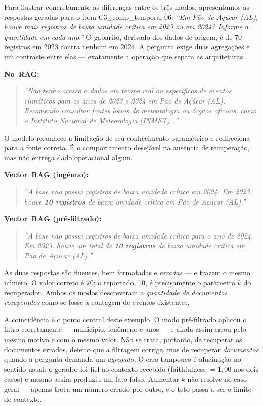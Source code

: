 \documentclass[conference]{IEEEtran}
\begin{document}
Para ilustrar concretamente as diferenças entre os três modos,
apresentamos as respostas geradas para o item C3\_comp\_temporal-06:
\emph{``Em Pão de Açúcar (AL), houve mais registros de baixa umidade
crítica em 2023 ou em 2024? Informe a quantidade em cada ano.''}
O gabarito, derivado dos dados de origem, é de 70 registros em 2023
contra nenhum em 2024. A pergunta exige duas agregações e um contraste
entre elas --- exatamente a operação que separa as arquiteturas.

\textbf{No~RAG:}
\begin{quote}
\textit{``Não tenho acesso a dados em tempo real ou específicos de
eventos climáticos para os anos de 2023 e 2024 em Pão de Açúcar (AL).
Recomendo consultar fontes locais de meteorologia ou órgãos oficiais,
como o Instituto Nacional de Meteorologia (INMET)\ldots''}
\end{quote}
O modelo reconhece a limitação de seu conhecimento paramétrico e
redireciona para a fonte correta. É o comportamento desejável na
ausência de recuperação, mas não entrega dado operacional algum.

\textbf{Vector~RAG (ingênuo):}
\begin{quote}
\textit{``A base não possui registros de baixa umidade crítica em 2024.
Em 2023, houve \textbf{10 registros} de baixa umidade crítica em Pão de
Açúcar (AL).''}
\end{quote}

\textbf{Vector~RAG (pré-filtrado):}
\begin{quote}
\textit{``A base não possui registros de baixa umidade crítica para o ano de
2024. Em 2023, houve um total de \textbf{10 registros} de baixa umidade crítica
em Pão de Açúcar (AL).''}
\end{quote}
As duas respostas são fluentes, bem formatadas e \emph{erradas} --- e trazem o
mesmo número. O valor correto é 70; o reportado, 10, é precisamente o parâmetro
$k$ do recuperador. Ambos os modos descreveram a \emph{quantidade de documentos
recuperados} como se fosse a contagem de eventos existentes.

A coincidência é o ponto central deste exemplo. O modo pré-filtrado aplicou o
filtro corretamente --- município, fenômeno e anos --- e ainda assim errou pelo
mesmo motivo e com o mesmo valor. Não se trata, portanto, de recuperar os
documentos errados, defeito que a filtragem corrige, mas de recuperar
\emph{documentos} quando a pergunta demanda um \emph{agregado}. O erro tampouco
é alucinação no sentido usual: o gerador foi fiel ao contexto recebido
(faithfulness $=1{,}00$ nos dois casos) e mesmo assim produziu um fato falso.
Aumentar $k$ não resolve no caso geral --- apenas troca um número errado por
outro, e o teto passa a ser o limite de contexto.
\end{document}
